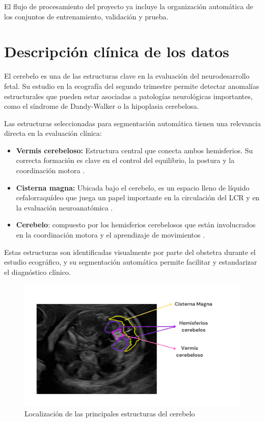 El flujo de procesamiento del proyecto ya incluye la organización automática de los conjuntos de entrenamiento, validación y prueba.
    
\section{Descripción clínica de los datos}

El cerebelo es una de las estructuras clave en la evaluación del neurodesarrollo fetal. Su estudio en la ecografía del segundo trimestre permite detectar anomalías estructurales que pueden estar asociadas a patologías neurológicas importantes, como el síndrome de Dandy-Walker o la hipoplasia cerebelosa.

Las estructuras seleccionadas para segmentación automática tienen una relevancia directa en la evaluación clínica:

\begin{itemize}
    \item \textbf{Vermis cerebeloso:} Estructura central que conecta ambos hemisferios. Su correcta formación es clave en el control del equilibrio, la postura y la coordinación motora \cite{wolf2009vermis}.
    \item \textbf{Cisterna magna:} Ubicada bajo el cerebelo, es un espacio lleno de líquido cefalorraquídeo que juega un papel importante en la circulación del LCR y en la evaluación neuroanatómica \cite{patel2023cisternamagna}. 
    \item \textbf{Cerebelo}: compuesto por los hemisferios cerebelosos que están involucrados en la coordinación motora y el aprendizaje de movimientos \cite{volpecerebelo}.
\end{itemize}
Estas estructuras son identificadas visualmente por parte del obstetra durante el estudio ecográfico, y su segmentación automática permite facilitar y estandarizar el diagnóstico clínico.

\begin{figure}[h]
    \centering
    \includegraphics[width=\textwidth]{img/estructuras_interes.jpeg}
    \caption{Localización de las principales estructuras del cerebelo}
    \label{fig: parte_anatomicas_cerebelo}
\end{figure}
